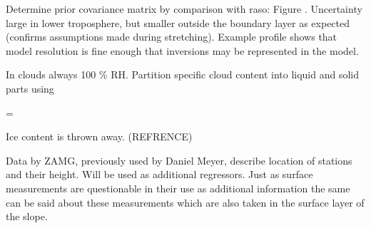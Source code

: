     Determine prior covariance matrix by comparison with raso: Figure
    . Uncertainty large in lower troposphere, but smaller
    outside the boundary layer as expected (confirms assumptions made during
    stretching). Example profile shows that model resolution is fine enough
    that inversions may be represented in the model.

    In clouds always 100 \% RH. Partition specific cloud content into liquid
    and solid parts using

    \startformula
        \QLIQ = \QCLOUD \startcases
              \KELVIN \le \TEMP \NR
            \NC \frac{\TEMP - 233.15 \KELVIN}{40 \KELVIN}
                 \KELVIN \lt \TEMP {} \KELVIN \NR
              \KELVIN \le \TEMP \NR
        \stopcases
    \stopformula

    Ice content is thrown away. (REFRENCE)

            {}

\stopsection


\startsection[title={Nordkette Slope Measurements}]

    Data by ZAMG, previously used by Daniel Meyer, describe location of
    stations and their height. Will be used as additional regressors.
    Just as surface measurements are questionable in their use as additional
    information the same can be said about these measurements which are also
    taken in the surface layer of the slope.

\stopsection

